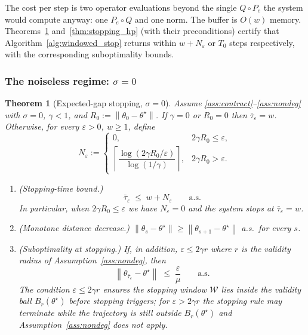 \documentclass[12pt,a4paper]{article}
\newtheorem{theorem}[definition]{Theorem}
\newcommand{\norm}[1]{\left\lVert#1\right\rVert}
\begin{document}
The cost per step is two operator evaluations beyond the single $Q \circ P_e$
the system would compute anyway: one $P_e \circ Q$ and one norm. The
buffer is $O(w)$ memory. Theorems~\ref{thm:stopping_det}
and~\ref{thm:stopping_hp} (with their preconditions) certify that
Algorithm~\ref{alg:windowed_stop} returns within $w + N_\varepsilon$ or
$T_0$ steps respectively, with the corresponding suboptimality bounds.

\subsubsection*{The noiseless regime: $\sigma = 0$}

\begin{theorem}[Expected-gap stopping, $\sigma = 0$]
\label{thm:stopping_det}
Assume \ref{ass:contract}--\ref{ass:nondeg} with $\sigma = 0$, $\gamma < 1$,
and $R_0 := \norm{\theta_0 - \theta^\star}$. If $\gamma = 0$ or $R_0 = 0$
then $\bar\tau_\varepsilon = w$. Otherwise, for every $\varepsilon > 0$,
$w \geq 1$, define
\[
N_\varepsilon :=
\begin{cases}
0, & 2\gamma R_0 \leq \varepsilon,\\[4pt]
\left\lceil
  \dfrac{\log(2\gamma R_0/\varepsilon)}{\log(1/\gamma)}
\right\rceil, & 2\gamma R_0 > \varepsilon.
\end{cases}
\]
\begin{enumerate}
\item[(i)] \textnormal{(Stopping-time bound.)}
\begin{equation}
\label{eq:stop_time_det}
\bar\tau_\varepsilon \;\leq\; w + N_\varepsilon \qquad \text{a.s.}
\end{equation}
In particular, when $2\gamma R_0 \leq \varepsilon$ we have $N_\varepsilon = 0$
and the system stops at $\bar\tau_\varepsilon = w$.

\item[(ii)] \textnormal{(Monotone distance decrease.)}
$\norm{\theta_s - \theta^\star} \geq \norm{\theta_{s+1} - \theta^\star}$
a.s.\ for every $s$.

\item[(iii)] \textnormal{(Suboptimality at stopping.)}
If, in addition, $\varepsilon \leq 2\gamma r$ where $r$ is the validity radius
of Assumption~\ref{ass:nondeg}, then
\[
  \norm{\theta_{\bar\tau_\varepsilon} - \theta^\star}
  \;\leq\; \frac{\varepsilon}{\mu} \qquad \text{a.s.}
\]
The condition $\varepsilon \leq 2\gamma r$ ensures the stopping window
$\mathcal{W}$ lies inside the validity ball $B_r(\theta^\star)$ before
stopping triggers; for $\varepsilon > 2\gamma r$ the stopping rule may
terminate while the trajectory is still outside $B_r(\theta^\star)$ and
Assumption~\ref{ass:nondeg} does not apply.
\end{enumerate}
\end{theorem}
\end{document}
